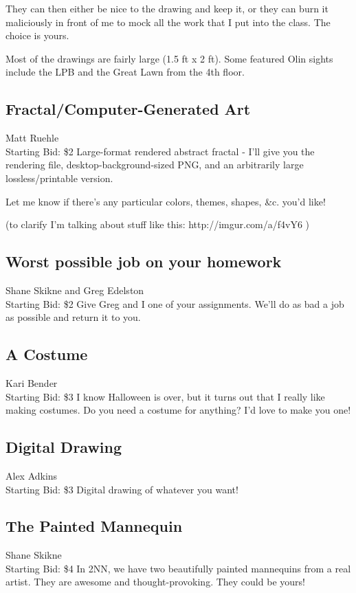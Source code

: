 \documentclass[11pt]{article}
\begin{document}
They can then either be nice to the drawing and keep it, or they can burn it maliciously in front of me to mock all the work that I put into the class. The choice is yours.

Most of the drawings are fairly large (1.5 ft x 2 ft). Some featured Olin sights include the LPB and the Great Lawn from the 4th floor.
\subsection{Fractal/Computer-Generated Art}
Matt Ruehle
\\
Starting Bid: \$2
\newline
Large-format rendered abstract fractal - I'll give you the rendering file, desktop-background-sized PNG, and an arbitrarily large lossless/printable version.

Let me know if there's any particular colors, themes, shapes, \&c. you'd like!

(to clarify I'm talking about stuff like this: http://imgur.com/a/f4vY6 )
\subsection{Worst possible job on your homework}
Shane Skikne and Greg Edelston
\\
Starting Bid: \$2
\newline
Give Greg and I one of your assignments. We'll do as bad a job as possible and return it to you.
\subsection{A Costume}
Kari Bender
\\
Starting Bid: \$3
\newline
I know Halloween is over, but it turns out that I really like making costumes. Do you need a costume for anything? I'd love to make you one!
\subsection{Digital Drawing}
Alex Adkins
\\
Starting Bid: \$3
\newline
Digital drawing of whatever you want!
\subsection{The Painted Mannequin}
Shane Skikne
\\
Starting Bid: \$4
\newline
In 2NN, we have two beautifully painted mannequins from a real artist. They are awesome and thought-provoking.  They could be yours!
\end{document}
